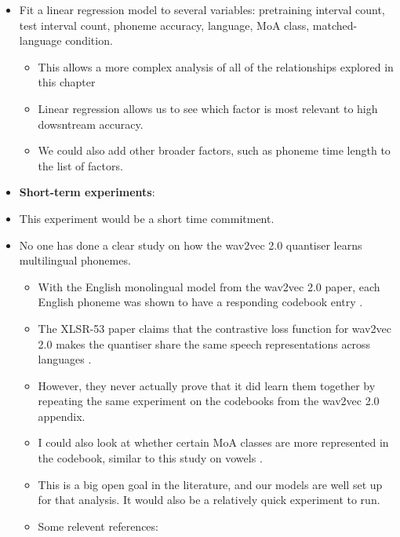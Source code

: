\begin{itemize}
    \item Fit a linear regression model to several variables: pretraining interval count, test interval count, phoneme accuracy, language, MoA class, matched-language condition.
    \begin{itemize}
        \item This allows a more complex analysis of all of the relationships explored in this chapter
        \item Linear regression allows us to see which factor is most relevant to high dowsntream accuracy.
        \item We could also add other broader factors, such as phoneme time length to the list of factors.
    \end{itemize}
    \fi
    \item \textbf{Short-term experiments}:
    \item This experiment would be a short time commitment.
    \item No one has done a clear study on how the wav2vec 2.0 quantiser learns multilingual phonemes.
    \begin{itemize}
        \item With the English monolingual model from the wav2vec 2.0 paper, each English phoneme was shown to have a responding codebook entry \cite{wav2vec}.
        \item The XLSR-53 paper claims that the contrastive loss function for wav2vec 2.0 makes the quantiser share the same speech representations across languages \cite{XLSR-53}.
        \item However, they never actually prove that it did learn them together by repeating the same experiment on the codebooks from the wav2vec 2.0 appendix.%
        \item I could also look at whether certain MoA classes are more represented in the codebook, similar to this study on vowels \cite{cambara2022recycle}.
        \item This is a big open goal in the literature, and our models are well set up for that analysis. It would also be a relatively quick experiment to run.
        \item Some relevent references: \cite{wang2025normalization, linke2023self, lee2024balanced}

\end{itemize}
\end{itemize}

